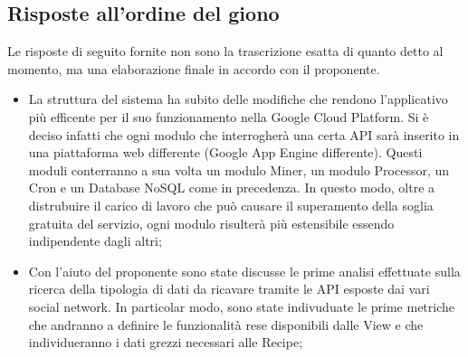 \subsection{Risposte all'ordine del giono}
Le risposte di seguito fornite non sono la trascrizione esatta di quanto detto al momento, ma una
elaborazione finale in accordo con il proponente.
\begin{itemize}
  \item La struttura del sistema ha subito delle modifiche che rendono l'applicativo più efficente
  per il suo funzionamento nella Google Cloud Platform. Si è deciso infatti che ogni modulo che
  interrogherà una certa API sarà inserito in una piattaforma web differente (Google App Engine differente).
  Questi moduli conterranno a sua volta un modulo Miner, un modulo Processor, un Cron e un Database NoSQL
  come in precedenza. In questo modo, oltre a distrubuire il carico di lavoro che può causare il superamento
  della soglia gratuita del servizio, ogni modulo risulterà più estensibile essendo indipendente dagli altri;

  \item Con l'aiuto del proponente sono state discusse le prime analisi effettuate sulla ricerca della
  tipologia di dati da ricavare tramite le API esposte dai vari social network. In particolar modo, sono
  state indivuduate le prime metriche che andranno a definire le funzionalità rese disponibili dalle View e
  che individueranno i dati grezzi necessari alle Recipe;


\end{itemize}
